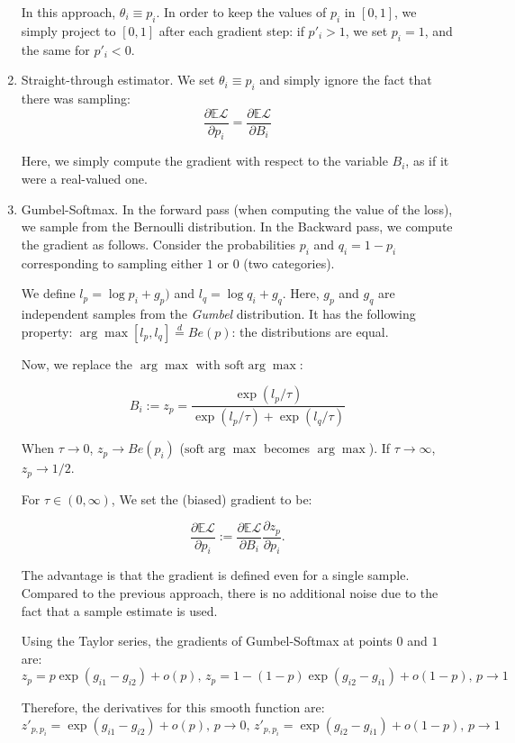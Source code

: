 \documentclass[a4paper,11pt,oneside]{report}
\begin{document}
\begin{enumerate}
    In this approach, $\theta_i\equiv p_i$. In order to keep the values of $p_i$ in $[0,1]$, we simply project to $[0,1]$ after each gradient step: if $p'_i>1$, we set $p_i=1$, and the same for $p'_i<0$.

    \item Straight-through estimator. We set $\theta_i\equiv p_i$ and simply ignore the fact that there was sampling:
    $$
    \frac{\partial \mathbb E \mathcal L}{\partial p_i}=\frac{\partial \mathbb E \mathcal L}{\partial B_i}
    $$

    Here, we simply compute the gradient with respect to the variable $B_i$, as if it were a real-valued one.
    \item Gumbel-Softmax\cite{Jang}. In the forward pass (when computing the value of the loss), we sample from the Bernoulli distribution. In the Backward pass, we compute the gradient as follows. Consider the probabilities $p_i$ and $q_i=1-p_i$ corresponding to sampling either $1$ or $0$ (two categories).

    We define $l_p=\log p_i+g_p)$ and $l_q=\log q_i+g_q$. Here, $g_p$ and $g_q$ are independent samples from the {\em Gumbel} distribution. It has the following property: $\arg\max [l_p, l_q]\overset{d}{=}Be(p)$: the distributions are equal.

    Now, we replace the $\arg\max$ with $\mbox{soft}\arg\max$:

    $$
    B_i:=z_p=\frac{\exp(l_p/\tau)}{\exp(l_p/\tau)+\exp(l_q/\tau)}
    $$

    When $\tau\to 0$, $z_p\to Be(p_i)$ ($\mbox{soft}\arg\max$ becomes $\arg\max$). If $\tau\to\infty$, $z_p\to1/2$.

    For $\tau\in(0,\infty)$, We set the (biased) gradient to be:

    $$
    \frac{\partial \mathbb E\mathcal L}{\partial p_i}:=\frac{\partial \mathbb E \mathcal L}{\partial B_i}\frac{\partial z_p}{\partial p_i}.
    $$

    The advantage is that the gradient is defined even for a single sample. Compared to the previous approach, there is no additional noise due to the fact that a sample estimate is used.


    Using the Taylor series, the gradients of Gumbel-Softmax at points $0$ and $1$ are:
    $$
    z_p=p\exp(g_{i1}-g_{i2})+o(p),\,
    z_p=1-(1-p)\exp(g_{i2}-g_{i1})+o(1-p),\,p\to 1
    $$

    Therefore, the derivatives for this smooth function are:
    $$
    z'_{p,p_i}=\exp(g_{i1}-g_{i2})+o(p),\,p\to 0,\,z'_{p,p_i}=\exp(g_{i2}-g_{i1})+o(1-p),\,p\to 1
    $$


\end{enumerate}
\end{document}
